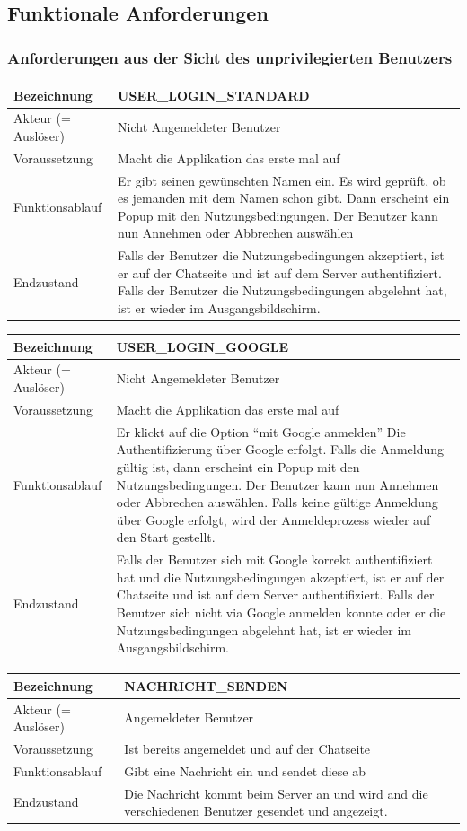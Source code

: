\documentclass[12pt]{article}
\newcommand{\requirementTable}[5]{
    \begin{table}[H]
      \begin{tabularx}{\textwidth}{|l|X|}
        \hline
        Bezeichnung & #1  \\ \hline
        Akteur (= Auslöser) & #2  \\ \hline
        Voraussetzung & #3  \\ \hline
        Funktionsablauf & #4  \\ \hline
        Endzustand & #5  \\ \hline
      \end{tabularx}
    \end{table}
}
\begin{document}
    \subsection{Funktionale Anforderungen}
      \subsubsection{Anforderungen aus der Sicht des unprivilegierten Benutzers}
        \requirementTable
            {USER\_LOGIN\_STANDARD}
            {Nicht Angemeldeter Benutzer}
            {Macht die Applikation das erste mal auf}
            {
            Er gibt seinen gewünschten Namen ein. \newline
            Es wird geprüft, ob es jemanden mit dem Namen schon gibt. \newline
            Dann erscheint ein Popup mit den Nutzungsbedingungen. Der Benutzer kann nun Annehmen oder Abbrechen auswählen
            }
            {
            Falls der Benutzer die Nutzungsbedingungen akzeptiert, ist er auf der Chatseite und ist auf dem Server authentifiziert. Falls der Benutzer die Nutzungsbedingungen abgelehnt hat, ist er wieder im Ausgangsbildschirm.
            }
            
        \requirementTable
            {USER\_LOGIN\_GOOGLE}
            {Nicht Angemeldeter Benutzer}
            {Macht die Applikation das erste mal auf}
            {
            Er klickt auf die Option “mit Google anmelden” \newline
            Die Authentifizierung über Google erfolgt. \newline
            Falls die Anmeldung gültig ist, dann erscheint ein Popup mit den Nutzungsbedingungen. Der Benutzer kann nun Annehmen oder Abbrechen auswählen. \newline
            Falls keine gültige Anmeldung über Google erfolgt, wird der Anmeldeprozess wieder auf den Start gestellt.
            }
            {
            Falls der Benutzer sich mit Google korrekt authentifiziert hat und  die Nutzungsbedingungen akzeptiert, ist er auf der Chatseite und ist auf dem Server authentifiziert. \newline
            Falls der Benutzer sich nicht via Google anmelden konnte oder er die Nutzungsbedingungen abgelehnt hat, ist er wieder im Ausgangsbildschirm.
            }
            
        \requirementTable
            {NACHRICHT\_SENDEN}
            {Angemeldeter Benutzer}
            {Ist bereits angemeldet und auf der Chatseite}
            {Gibt eine Nachricht ein und sendet diese ab}
            {Die Nachricht kommt beim Server an und wird and die verschiedenen Benutzer gesendet und angezeigt.}
            
\end{document}
